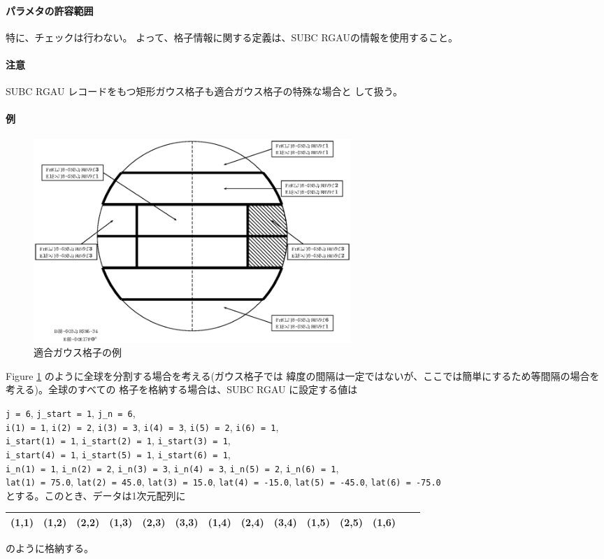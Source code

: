 \paragraph{パラメタの許容範囲}
特に、チェックは行わない。
よって、格子情報に関する定義は、SUBC RGAUの情報を使用すること。
\paragraph{注意}
SUBC RGAU レコードをもつ矩形ガウス格子も適合ガウス格子の特殊な場合と
して扱う。
\paragraph{例}
\begin{figure}
\begin{center}
\includegraphics[width=12cm]{rgau_fig.ps}
\end{center}
\caption{適合ガウス格子の例}
\label{rgau_fig}
\end{figure}
Figure \ref{rgau_fig} のように全球を分割する場合を考える(ガウス格子では
緯度の間隔は一定ではないが、ここでは簡単にするため等間隔の場合を
考える)。全球のすべての
格子を格納する場合は、SUBC RGAU に設定する値は 

\noindent
{\tt j = 6}, {\tt j\_start = 1}, {\tt j\_n = 6}, \\
{\tt i(1) = 1}, {\tt i(2) = 2}, {\tt i(3) = 3}, {\tt i(4) = 3}, 
{\tt i(5) = 2}, {\tt i(6) = 1},\\ 
{\tt i\_start(1) = 1}, {\tt i\_start(2) = 1}, {\tt i\_start(3) = 1}, \\
{\tt i\_start(4) = 1}, {\tt i\_start(5) = 1}, {\tt i\_start(6) = 1}, \\
{\tt i\_n(1) = 1}, {\tt i\_n(2) = 2}, {\tt i\_n(3) = 3}, {\tt i\_n(4) = 3}, 
{\tt i\_n(5) = 2}, {\tt i\_n(6) = 1},\\ 
{\tt lat(1) = 75.0}, {\tt lat(2) = 45.0}, {\tt lat(3) = 15.0}, 
{\tt lat(4) = -15.0}, {\tt lat(5) = -45.0}, {\tt lat(6) = -75.0}\\
とする。このとき、データは1次元配列に
\begin{center}
\begin{tabular}{|c|c|c|c|c|c|c|c|c|c|c|c|c|c|} \hline
(1,1) & (1,2) & (2,2) & (1,3) & (2,3) & (3,3) &
(1,4) & (2,4) & (3,4) & (1,5) & (2,5) & (1,6)\\ \hline
\end{tabular} 
\end{center}
のように格納する。

